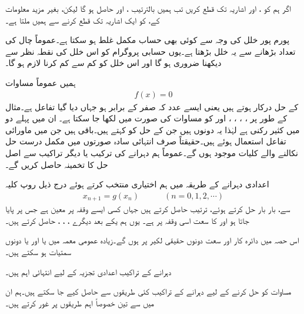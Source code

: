 اگر ہم  کو ،  اور  اشاریہ تک قطع کریں تب ہمیں بالترتیب ،  اور  حاصل ہو گا لیکن، بغیر مزید  معلومات کے،  کو ایک اشاریہ تک قطع کرنے سے ہمیں  ملتا ہے۔

پورم پور خلل کی وجہ سے کوئی بھی حساب مکمل غلط ہو سکتا ہے۔عموماً چال کی تعداد بڑھانے سے یہ خلل بڑھتا ہے۔یوں حسابی پروگرام کو اس خلل کی نقطہ نظر سے دیکھنا ضروری ہو گا اور اس خلل کو کم سے کم کرنا لازم ہو گا۔

ہمیں عموماً مساوات 
\begin{align}\label{مساوات_اعدادی_تفاعل_الف}
f(x)=0
\end{align}
کے حل درکار ہوتے ہیں یعنی ایسے عدد  کہ  صفر کے برابر ہو جہاں  دیا گیا تفاعل ہے۔مثال کے طور پر ، ، ، ،  اور  کو مساوات  کی صورت میں لکھا جا سکتا ہے۔ ان میں پہلے دو میں  کثیر رکنی ہے لہٰذا یہ دونوں  ہیں جن کے حل کو  کہتے ہیں۔باقی  ہیں جن میں ماورائی تفاعل استعمال ہوئے ہیں۔حقیقتاً صرف انتہائی سادہ صورتوں میں مکمل درست حل نکالنے والے کلیات موجود ہوں گے۔عموماً ہم دہرانے کی ترکیب یا دیگر تراکیب سے اصل حل کا تخمینہ حاصل کریں گے۔

اعدادی دہرانے کے طریقہ میں ہم اختیاری  منتخب کرتے ہوئے  درج ذیل روپ کلیہ
\begin{align}\label{مساوات_اعدادی_تفاعل_ب}
x_{n+1}=g(x_n)\quad \quad \quad (n=0,1,2,\cdots)
\end{align}
سے، بار بار حل کرتے ہوئے، ترتیب  حاصل کرتے ہیں جہاں  کسی ایسے وقفہ پر معین ہے جس پر  پایا جاتا ہو اور   کا سعت اسی وقفہ پر ہے۔ یوں ہم یکے بعد دیگرے ،  ، ،  حاصل کرتے ہیں۔

اس حصہ میں دائرہ کار اور سعت  دونوں حقیقی لکیر پر ہوں گے۔زیادہ عمومی معمہ میں  یا  اور یا دونوں سمتیات ہو سکتے ہیں۔

دہرانے کے تراکیب اعدادی تجزیہ کے لیے انتہائی اہم ہیں۔

مساوات  کو حل کرنے کے لیے  دہرانے کے تراکیب کئی طریقوں سے حاصل کیے جا سکتے ہیں۔ہم ان میں سے تین خصوصاً اہم طریقوں پر غور کرتے ہیں۔

